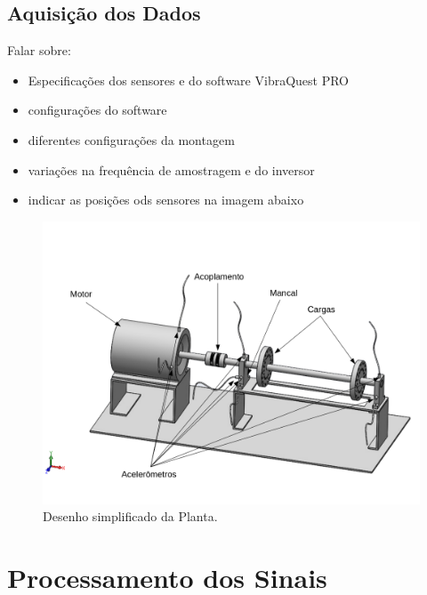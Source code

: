 % 

\subsection{Aquisição dos Dados}

Falar sobre: 
\begin{itemize}
    \item Especificações dos sensores e do software VibraQuest PRO
    \item configurações do software
    \item diferentes configurações da montagem
    \item variações na frequência de amostragem e do inversor
    \item indicar as posições ods sensores na imagem abaixo 
\end{itemize}

\begin{figure}[H]
    \caption{Desenho simplificado da Planta.}
    \begin{center}
        \includegraphics[scale=.5]{metodologia/img/lateral_desenho.png}
    \end{center}
    \label{fig:}
\end{figure}
% 

\section{Processamento dos Sinais}

